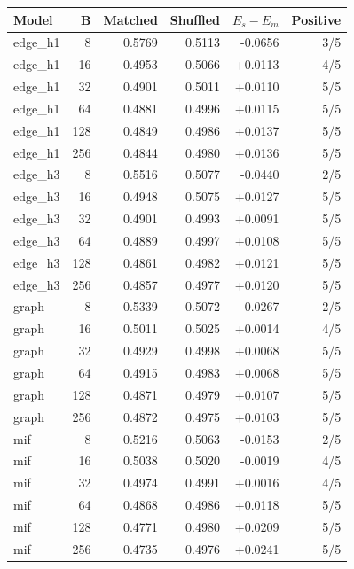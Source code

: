 
\begin{tablehere}
\footnotesize
\setlength{\tabcolsep}{3pt}
\caption{mpe, representation probe: all budgets. Same true-action target, linear ridge probe; positive differences favor matched alignment.}

\begin{tabular}{lrrrrr}\toprule
Model & B & Matched & Shuffled & $E_s-E_m$ & Positive \\ \midrule
edge\_h1 & 8 & 0.5769 & 0.5113 & -0.0656 & 3/5 \\
edge\_h1 & 16 & 0.4953 & 0.5066 & +0.0113 & 4/5 \\
edge\_h1 & 32 & 0.4901 & 0.5011 & +0.0110 & 5/5 \\
edge\_h1 & 64 & 0.4881 & 0.4996 & +0.0115 & 5/5 \\
edge\_h1 & 128 & 0.4849 & 0.4986 & +0.0137 & 5/5 \\
edge\_h1 & 256 & 0.4844 & 0.4980 & +0.0136 & 5/5 \\
edge\_h3 & 8 & 0.5516 & 0.5077 & -0.0440 & 2/5 \\
edge\_h3 & 16 & 0.4948 & 0.5075 & +0.0127 & 5/5 \\
edge\_h3 & 32 & 0.4901 & 0.4993 & +0.0091 & 5/5 \\
edge\_h3 & 64 & 0.4889 & 0.4997 & +0.0108 & 5/5 \\
edge\_h3 & 128 & 0.4861 & 0.4982 & +0.0121 & 5/5 \\
edge\_h3 & 256 & 0.4857 & 0.4977 & +0.0120 & 5/5 \\
graph & 8 & 0.5339 & 0.5072 & -0.0267 & 2/5 \\
graph & 16 & 0.5011 & 0.5025 & +0.0014 & 4/5 \\
graph & 32 & 0.4929 & 0.4998 & +0.0068 & 5/5 \\
graph & 64 & 0.4915 & 0.4983 & +0.0068 & 5/5 \\
graph & 128 & 0.4871 & 0.4979 & +0.0107 & 5/5 \\
graph & 256 & 0.4872 & 0.4975 & +0.0103 & 5/5 \\
mif & 8 & 0.5216 & 0.5063 & -0.0153 & 2/5 \\
mif & 16 & 0.5038 & 0.5020 & -0.0019 & 4/5 \\
mif & 32 & 0.4974 & 0.4991 & +0.0016 & 4/5 \\
mif & 64 & 0.4868 & 0.4986 & +0.0118 & 5/5 \\
mif & 128 & 0.4771 & 0.4980 & +0.0209 & 5/5 \\
mif & 256 & 0.4735 & 0.4976 & +0.0241 & 5/5 \\
\bottomrule\end{tabular}
\end{tablehere}

